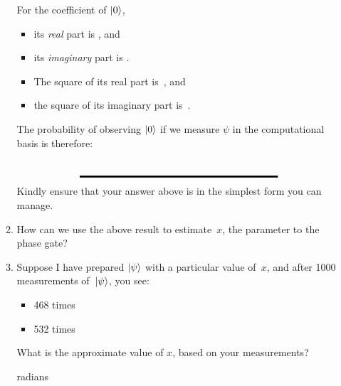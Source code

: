 \documentclass[12pt]{article}
\begin{document}
\begin{enumerate}
\begin{enumerate}[label=\theenumi.\arabic*]
  For the coefficient of $\ket{0}$,
  \begin{itemize}
      \item its \emph{real} part is \Blank[10em]{}, and
      \item its \emph{imaginary} part is \Blank[10em]{}.
      \item The square of its real part is~\Blank[10em]{}, and
      \item the square of its imaginary part is~\Blank[10em]{}.
  \end{itemize}
  The probability of observing $\ket{0}$ if we measure $\psi$ in the computational basis is therefore:
  \[
  \Blank[20em]{}
  \]
  Kindly ensure that your answer above is in the simplest form you can manage.
  \item How can we use the above result to estimate~$x$, the parameter to the phase gate?
  \LeaveSpace{}
  \item Suppose I have prepared $\ket{\psi}$ with a particular value of~$x$, and after 1000 measurements of~$\ket{\psi}$, you see:
  \begin{itemize}
      \item \QZero{} 468 times
      \item \QOne{} 532 times
  \end{itemize}
  What is the approximate value of $x$, based on your measurements?
  
  \Blank{} radians
\end{enumerate}
\end{enumerate}
\end{document}
